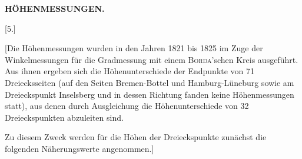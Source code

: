 \par\clearpage
\noindent\null\hfill{\small\textbf{HÖHENMESSUNGEN.}}\hfill{}\par\medskip
\begin{center}
[5.]\par{}
\end{center}
\par\noindent\hspace*{\parindent}[Die Höhenmessungen wurden in den Jahren 1821 bis 1825 im Zuge der
Winkelmessungen für die Gradmessung mit einem \textsc{Borda}'schen Kreis ausgeführt.
Aus ihnen ergeben sich die Höhenunterschiede der Endpunkte von 71 Dreiecksseiten
(auf den Seiten Bremen-Bottel und Hamburg-Lüneburg sowie am Dreieckspunkt
Inselsberg und in dessen Richtung fanden keine Höhenmessungen statt), aus denen durch Ausgleichung
die Höhenunterschiede von 32 Dreieckspunkten abzuleiten sind.
\par\noindent\hspace*{\parindent}Zu diesem Zweck werden für die Höhen der Dreieckspunkte zunächst die
folgenden Näherungswerte angenommen.]
\par\medskip
